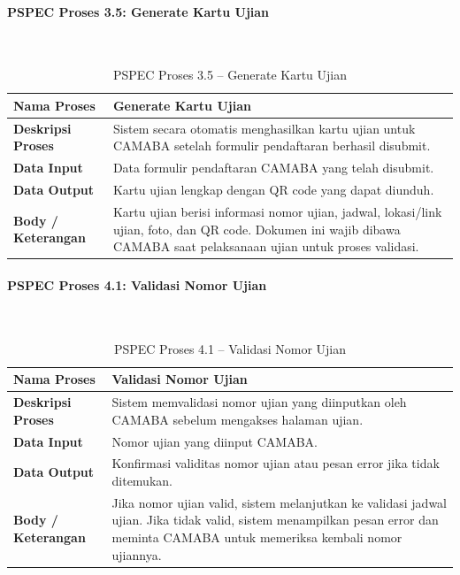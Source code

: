 \paragraph{PSPEC Proses 3.5: Generate Kartu Ujian}~\\
\begin{longtable}{|p{}|p{}|}
	\caption{PSPEC Proses 3.5 -- Generate Kartu Ujian}
	\label{table:3.pspec35}\\
	\hline
	\textbf{Nama Proses} & Generate Kartu Ujian \\
	\hline
	\textbf{Deskripsi Proses} & Sistem secara otomatis menghasilkan kartu ujian untuk CAMABA setelah formulir pendaftaran berhasil disubmit. \\
	\hline
	\textbf{Data Input} & Data formulir pendaftaran CAMABA yang telah disubmit. \\
	\hline
	\textbf{Data Output} & Kartu ujian lengkap dengan QR code yang dapat diunduh. \\
	\hline
	\textbf{Body / Keterangan} & Kartu ujian berisi informasi nomor ujian, jadwal, lokasi/link ujian, foto, dan QR code. Dokumen ini wajib dibawa CAMABA saat pelaksanaan ujian untuk proses validasi. \\
	\hline
\end{longtable}

\paragraph{PSPEC Proses 4.1: Validasi Nomor Ujian}~\\
\begin{longtable}{|p{}|p{}|}
	\caption{PSPEC Proses 4.1 -- Validasi Nomor Ujian}
	\label{table:3.pspec41}\\
	\hline
	\textbf{Nama Proses} & Validasi Nomor Ujian \\
	\hline
	\textbf{Deskripsi Proses} & Sistem memvalidasi nomor ujian yang diinputkan oleh CAMABA sebelum mengakses halaman ujian. \\
	\hline
	\textbf{Data Input} & Nomor ujian yang diinput CAMABA. \\
	\hline
	\textbf{Data Output} & Konfirmasi validitas nomor ujian atau pesan error jika tidak ditemukan. \\
	\hline
	\textbf{Body / Keterangan} & Jika nomor ujian valid, sistem melanjutkan ke validasi jadwal ujian. Jika tidak valid, sistem menampilkan pesan error dan meminta CAMABA untuk memeriksa kembali nomor ujiannya. \\
	\hline
\end{longtable}

